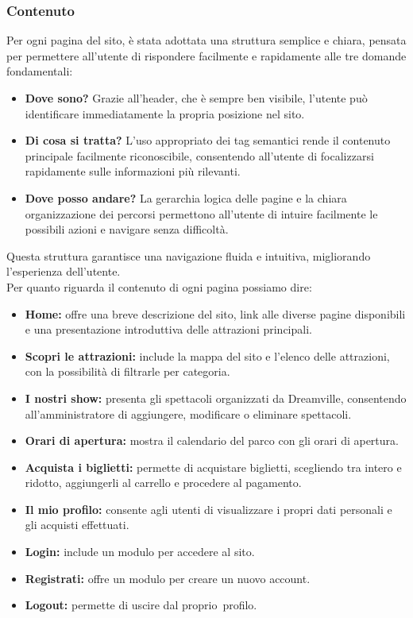 \subsubsection{Contenuto}
Per ogni pagina del sito, è stata adottata una struttura semplice e chiara, pensata per permettere all'utente di rispondere facilmente e rapidamente alle tre domande fondamentali:
\begin{itemize}
    \item \textbf{Dove sono?} Grazie all'header, che è sempre ben visibile, l'utente può identificare immediatamente la propria posizione nel sito.
    \item \textbf{Di cosa si tratta?} L'uso appropriato dei tag semantici rende il contenuto principale facilmente riconoscibile, consentendo all'utente di focalizzarsi rapidamente sulle informazioni più rilevanti.
    \item \textbf{Dove posso andare?} La gerarchia logica delle pagine e la chiara organizzazione dei percorsi permettono all'utente di intuire facilmente le possibili azioni e navigare senza difficoltà.
\end{itemize}
Questa struttura garantisce una navigazione fluida e intuitiva, migliorando l'esperienza dell'utente.\\
Per quanto riguarda il contenuto di ogni pagina possiamo dire:
\begin{itemize}
    \item \textbf{Home:} offre una breve descrizione del sito, link alle diverse pagine disponibili e una presentazione introduttiva delle attrazioni principali.
    \item \textbf{Scopri le attrazioni:} include la mappa del sito e l'elenco delle attrazioni, con la possibilità di filtrarle per categoria.
    \item \textbf{I nostri show:} presenta gli spettacoli organizzati da Dreamville, consentendo all'amministratore di aggiungere, modificare o eliminare spettacoli.
    \item \textbf{Orari di apertura:} mostra il calendario del parco con gli orari di apertura.
    \item \textbf{Acquista i biglietti:} permette di acquistare biglietti, scegliendo tra intero e ridotto, aggiungerli al carrello e procedere al pagamento.
    \item \textbf{Il mio profilo:} consente agli utenti di visualizzare i propri dati personali e gli acquisti effettuati.
    \item \textbf{Login:} include un modulo per accedere al sito.
    \item \textbf{Registrati:} offre un modulo per creare un nuovo account.
    \item \textbf{Logout:} permette di uscire dal proprio profilo.
\end{itemize}
